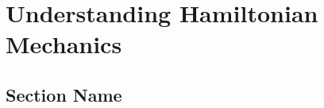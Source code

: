 \documentclass[../../note.tex]{subfiles}
\begin{document}
\chapter{Understanding Hamiltonian Mechanics}

\section{Section Name}
\end{document}
